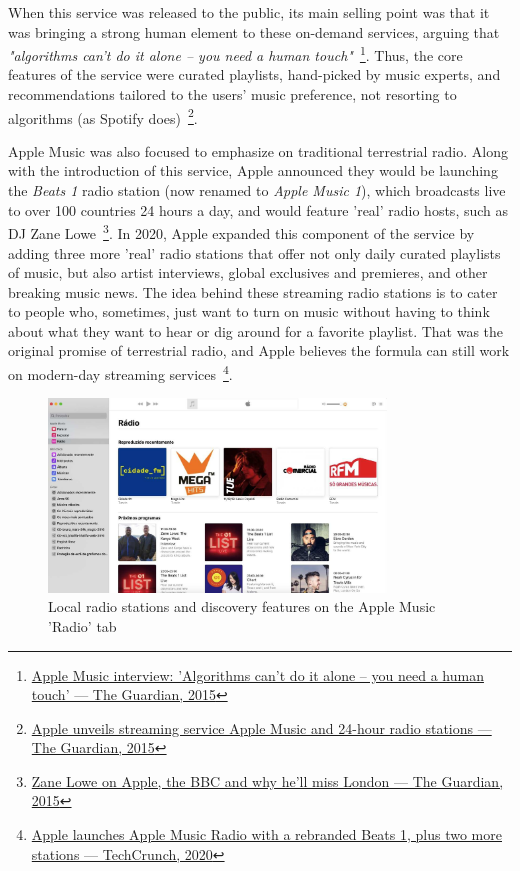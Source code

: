 When this service was released to the public, its main selling point was that it was bringing a strong human element to these on-demand services, arguing that \textit{"algorithms can't do it alone – you need a human touch"}~\footnote{\href{https://www.theguardian.com/technology/2015/jun/09/apple-music-interview-jimmy-iovine-eddy-cue}{Apple Music interview: 'Algorithms can't do it alone – you need a human touch' — The Guardian, 2015}}. Thus, the core features of the service were curated playlists, hand-picked by music experts, and recommendations tailored to the users' music preference, not resorting to algorithms (as Spotify does)~\footnote{\href{https://www.theguardian.com/technology/2015/jun/08/apple-music-streaming-service-wwdc-spotify}{Apple unveils streaming service Apple Music and 24-hour radio stations — The Guardian, 2015}}.

Apple Music was also focused to emphasize on traditional terrestrial radio. Along with the introduction of this service, Apple announced they would be launching the \textit{Beats 1} radio station (now renamed to \textit{Apple Music 1}), which broadcasts live to over 100 countries 24 hours a day, and would feature 'real' radio hosts, such as DJ Zane Lowe~\footnote{\href{https://www.theguardian.com/music/2015/feb/16/zane-lowe-apple-bbc-london-radio1-la}{Zane Lowe on Apple, the BBC and why he’ll miss London — The Guardian, 2015}}. In 2020, Apple expanded this component of the service by adding three more 'real' radio stations that offer not only daily curated playlists of music, but also artist interviews, global exclusives and premieres, and other breaking music news. The idea behind these streaming radio stations is to cater to people who, sometimes, just want to turn on music without having to think about what they want to hear or dig around for a favorite playlist. That was the original promise of terrestrial radio, and Apple believes the formula can still work on modern-day streaming services~\footnote{\href{https://www.theguardian.com/music/2015/feb/16/zane-lowe-apple-bbc-london-radio1-la}{Apple launches Apple Music Radio with a rebranded Beats 1, plus two more stations — TechCrunch, 2020}}.

\begin{figure}[h]
\centering
\includegraphics[width=0.8\textwidth]{./Images/applemusic.png}
\caption{Local radio stations and discovery features on the Apple Music 'Radio' tab}
\label{fig:test_env}
\end{figure}

